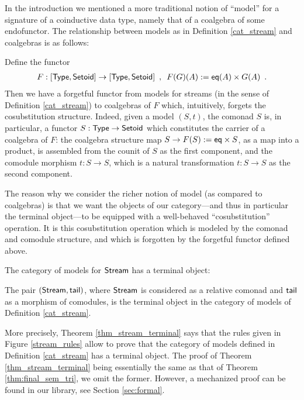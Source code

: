 \documentclass[a4paper,USenglish]{lipics}
\begin{document}
In the introduction we mentioned a more traditional notion of \enquote{model} for a signature of a coinductive data type, 
namely that of a coalgebra of some endofunctor. The relationship between models as in Definition \ref{cat_stream} and coalgebras is as follows:

\begin{rem}\label{rem:coalg_stream}
 Define the functor
  \begin{align*}  F: [\mathsf{Type},\mathsf{Setoid}] \to [\mathsf{Type},\mathsf{Setoid}]  \enspace , \enspace
                      F(G)(A) := \mathsf{eq}(A) \times G(A) \enspace .
  \end{align*}
  Then we have a forgetful functor from models for streams (in the sense of Definition \ref{cat_stream}) to coalgebras of $F$ which, intuitively, forgets the cosubstitution structure.
  Indeed, given a model $(S,t)$, the comonad $S$ is, in particular, a functor $S:\mathsf{Type}\to\mathsf{Setoid}$ which constitutes the carrier of 
  a coalgebra of $F$: the coalgebra structure map $S \to F(S):=\mathsf{eq}\times S$, as a map into a product, 
  is assembled from the counit of $S$ as the first component, and the comodule morphism $t:S\to S$, which
  is a natural transformation $t : S \to S$ as the second component.
\end{rem}
  
  The reason why we consider the richer notion of model (as compared to coalgebras) is that we want the objects of 
  our category---and thus in particular the terminal object---to be equipped with a well-behaved \enquote{cosubstitution} operation.
  It is this cosubstitution operation which is modeled by the comonad and comodule structure, and which is forgotten by 
  the forgetful functor defined above.

  
  The category of models for $\mathsf{Stream}$ has a terminal object:
  
\begin{theorem}\label{thm_stream_terminal}
 The pair $(\mathsf{Stream}, \mathsf{tail})$, where $\mathsf{Stream}$ is considered as a relative comonad and $\mathsf{tail}$ as
 a morphism of comodules, is the terminal object in the category of models of Definition \ref{cat_stream}.
\end{theorem}

More precisely, Theorem \ref{thm_stream_terminal} says that the rules given in Figure \ref{stream_rules} allow to prove that
the category of models defined in Definition \ref{cat_stream} has a terminal object.
The proof of Theorem \ref{thm_stream_terminal} being essentially the same as that of Theorem \ref{thm:final_sem_tri}, we omit the former.
However, a mechanized proof can be found in our \coq library, see Section \ref{sec:formal}.
\end{document}
